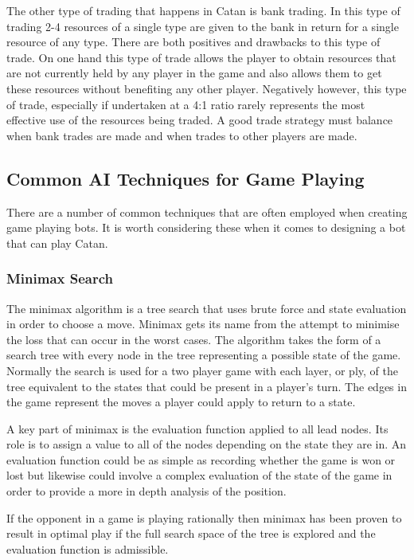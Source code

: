 \documentclass[]{article}
\begin{document}
\par The other type of trading that happens in Catan is bank trading. In this type of trading 2-4 resources of a single type are given to the bank in return for a single resource of any type. There are both positives and drawbacks to this type of trade. On one hand this type of trade allows the player to obtain resources that are not currently held by any player in the game and also allows them to get these resources without benefiting any other player. Negatively however, this type of trade, especially if undertaken at a 4:1 ratio rarely represents the most effective use of the resources being traded. A good trade strategy must balance when bank trades are made and when trades to other players are made.

\subsection{Common AI Techniques for Game Playing}
There are a number of common techniques that are often employed when creating game playing bots. It is worth considering these when it comes to designing a bot that can play Catan.
\subsubsection{Minimax Search}
The minimax algorithm is a tree search that uses brute force and state evaluation in order to choose a move. Minimax gets its name from the attempt to minimise the loss that can occur in the worst cases. The algorithm takes the form of a search tree with every node in the tree representing a possible state of the game. Normally the search is used for a two player game with each layer, or ply, of the tree equivalent to the states that could be present in a player's turn. The edges in the game represent the moves a player could apply to return to a state.

\par A key part of minimax is the evaluation function applied to all lead nodes. Its role is to assign a value to all of the nodes depending on the state they are in. An evaluation function could be as simple as recording whether the game is won or lost but likewise could involve a complex evaluation of the state of the game in order to provide a more in depth analysis of the position.

\par If the opponent in a game is playing rationally then minimax has been proven to result in optimal play if the full search space of the tree is explored and the evaluation function is admissible.
\end{document}
